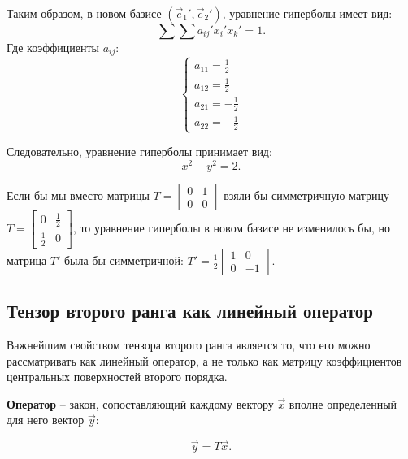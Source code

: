 \begin{solution}
	Таким образом, в новом базисе \( (\vec{e}_1{'}, \vec{e}_2{'}) \), уравнение гиперболы имеет вид:
	\[ \sum\sum a_{ij}' x_i' x_k' = 1. \]
	Где коэффициенты \( a_{ij} \):
	\[ \left\{ \begin{array}{l}
			a_{11} = \frac{1}{2} \\
			a_{12} = \frac{1}{2} \\
			a_{21} = -\frac{1}{2} \\
			a_{22} = -\frac{1}{2}
	\end{array} \right. \]
	
	Следовательно, уравнение гиперболы принимает вид:
	\[ x^2 - y^2 = 2. \]
	\end{solution}
	
	\begin{remark}
	Если бы мы вместо матрицы \( T = \left[ \begin{smallmatrix} 0 & 1 \\ 0 & 0 \end{smallmatrix} \right] \) взяли бы симметричную матрицу \( T = \left[ \begin{smallmatrix} 0 & \frac{1}{2} \\ \frac{1}{2} & 0 \end{smallmatrix} \right] \), то уравнение гиперболы в новом базисе не изменилось бы, но матрица \( T' \) была бы симметричной: \( T' = \frac{1}{2}\left[ \begin{smallmatrix} 1 & 0 \\ 0 & -1 \end{smallmatrix} \right] \).
	\end{remark}
	
\subsection{Тензор второго ранга как линейный оператор}

	Важнейшим свойством тензора второго ранга является то, что его можно рассматривать как линейный оператор, а не только как матрицу коэффициентов центральных поверхностей второго порядка.
	
	\begin{definition}
	\textbf{Оператор} -- закон, сопоставляющий каждому вектору \( \vec{x} \) вполне определенный для него вектор \( \vec{y} \):
	\end{definition}
	\begin{equation}
		\vec{y} = T\vec{x}. \label{eq9:nn1}
	\end{equation}
	
